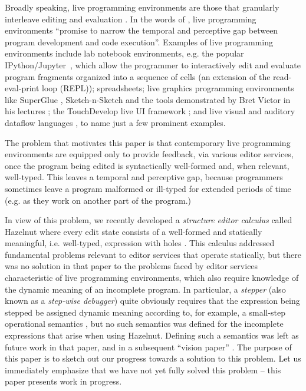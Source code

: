 
Broadly speaking, live programming environments are those that granularly interleave editing and evaluation \cite{DBLP:conf/icse/Tanimoto13,DBLP:journals/vlc/Tanimoto90,McDirmid:2007:LUL:1297027.1297073,burckhardt2013s}. 
In the words of \citet{burckhardt2013s}, live programming environments 
``promise to narrow the temporal and perceptive gap 
between program development and code execution''. Examples of live programming environments include {lab notebook environments},
e.g. the popular IPython/Jupyter~\cite{PER-GRA:2007}, which allow the
programmer to interactively edit and evaluate program fragments organized into a
sequence of cells (an extension of the read-eval-print loop (REPL)); spreadsheets; {live graphics programming environments} like SuperGlue \cite{McDirmid:2007:LUL:1297027.1297073}, Sketch-n-Sketch \cite{DBLP:conf/pldi/ChughHSA16} and the tools demonstrated by Bret Victor in his lectures \cite{victor2012inventing}; the TouchDevelop live UI framework \cite{Burckhardt:2013:ACF:2491956.2462170}; and live visual and auditory dataflow languages \cite{DBLP:conf/vl/BurnettAW98}, to name just a few prominent examples.


The problem that motivates this paper is that 
contemporary live programming environments are equipped only to provide feedback, via various editor services, once the program being edited is syntactically well-formed and, when relevant, well-typed. This leaves a temporal and perceptive gap, because programmers sometimes leave a program malformed or ill-typed for extended periods of time (e.g. as they work on another part of the program.)

In view of this problem, we recently developed a \emph{structure editor calculus} called Hazelnut where every edit state consists of a well-formed and statically meaningful, i.e. well-typed, expression with holes \cite{popl-paper}. This calculus addressed fundamental problems relevant to editor services that operate statically, but there was no solution in that paper to the problems faced by editor services characteristic of live programming environments, which also require knowledge of the dynamic meaning of an incomplete program. In particular, a \emph{stepper} (also known as a \emph{step-wise debugger}) quite obviously requires that the expression being stepped be assigned dynamic meaning according to, for example, a small-step operational semantics \cite{DBLP:journals/jlp/Plotkin04a,pfpl}, but no such semantics was defined for the incomplete expressions that arise when using Hazelnut. Defining such a semantics was left as future work in that paper, and in a subsequent ``vision paper'' \cite{snapl17-paper}. The purpose of this paper is to sketch out our progress towards a solution to this problem. Let us immediately emphasize that we have not yet fully solved this problem -- this paper presents work in progress.

